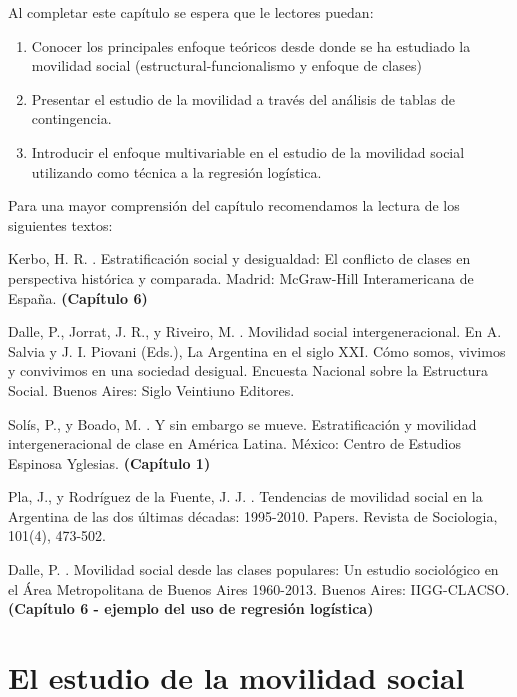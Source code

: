 \documentclass[
]{book}
\providecommand{\tightlist}{%
  \setlength{\itemsep}{0pt}\setlength{\parskip}{0pt}}
\begin{document}
Al completar este capítulo se espera que le lectores puedan:

\begin{enumerate}
\def\labelenumi{\arabic{enumi}.}
\tightlist
\item
  Conocer los principales enfoque teóricos desde donde se ha estudiado la movilidad social (estructural-funcionalismo y enfoque de clases)\\
\item
  Presentar el estudio de la movilidad a través del análisis de tablas de contingencia.\\
\item
  Introducir el enfoque multivariable en el estudio de la movilidad social utilizando como técnica a la regresión logística.
\end{enumerate}

Para una mayor comprensión del capítulo recomendamos la lectura de los siguientes textos:

Kerbo, H. R. \citeyearpar{Kerbo2003}. Estratificación social y desigualdad: El conflicto de clases en perspectiva histórica y comparada. Madrid: McGraw-Hill Interamericana de España. \textbf{(Capítulo 6)}

Dalle, P., Jorrat, J. R., y Riveiro, M. \citeyearpar{Dalle.etal2018}. Movilidad social intergeneracional. En A. Salvia y J. I. Piovani (Eds.), La Argentina en el siglo XXI. Cómo somos, vivimos y convivimos en una sociedad desigual. Encuesta Nacional sobre la Estructura Social. Buenos Aires: Siglo Veintiuno Editores.

Solís, P., y Boado, M. \citeyearpar{Solis.Boado2016}. Y sin embargo se mueve. Estratificación y movilidad intergeneracional de clase en América Latina. México: Centro de Estudios Espinosa Yglesias. \textbf{(Capítulo 1)}

Pla, J., y Rodríguez de la Fuente, J. J. \citeyearpar{Pla.RodriguezdelaFuente2016}. Tendencias de movilidad social en la Argentina de las dos últimas décadas: 1995-2010. Papers. Revista de Sociologia, 101(4), 473-502.

Dalle, P. \citeyearpar{Dalle2016}. Movilidad social desde las clases populares: Un estudio sociológico en el Área Metropolitana de Buenos Aires 1960-2013. Buenos Aires: IIGG-CLACSO. \textbf{(Capítulo 6 - ejemplo del uso de regresión logística)}

\hypertarget{movilidad1}{%
\section{El estudio de la movilidad social}\label{movilidad1}}
\end{document}
